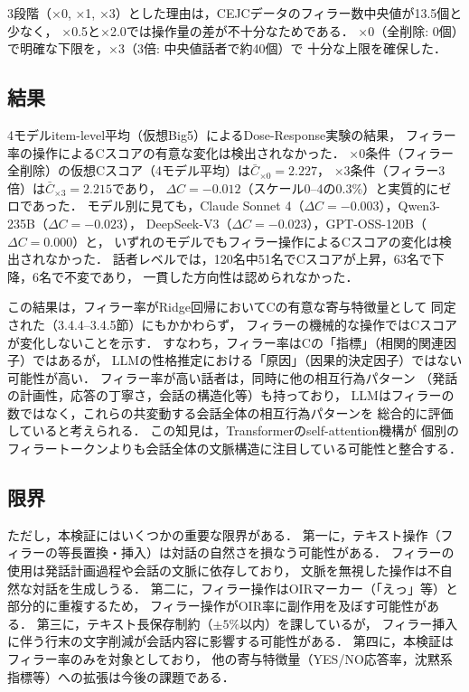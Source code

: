 \documentclass[dvipdfmx,11pt,a4paper]{bxjsarticle}
\renewcommand{\_}{\paperorigunderscore\allowbreak}%
\begin{document}
3段階（×0, ×1, ×3）とした理由は，CEJCデータのフィラー数中央値が13.5個と少なく，
×0.5と×2.0では操作量の差が不十分なためである．
×0（全削除: 0個）で明確な下限を，×3（3倍: 中央値話者で約40個）で
十分な上限を確保した．

\subsection{結果}

4モデルitem-level平均（仮想Big5）によるDose-Response実験の結果，
フィラー率の操作によるCスコアの有意な変化は検出されなかった．
×0条件（フィラー全削除）の仮想Cスコア（4モデル平均）は$\bar{C}_{{\times 0}} = 2.227$，
×3条件（フィラー3倍）は$\bar{C}_{{\times 3}} = 2.215$であり，
$\Delta C = -0.012$（スケール0--4の0.3\%）と実質的にゼロであった．
モデル別に見ても，Claude Sonnet 4（$\Delta C = -0.003$），Qwen3-235B（$\Delta C = -0.023$），
DeepSeek-V3（$\Delta C = -0.023$），GPT-OSS-120B（$\Delta C = 0.000$）と，
いずれのモデルでもフィラー操作によるCスコアの変化は検出されなかった．
話者レベルでは，120名中51名でCスコアが上昇，63名で下降，6名で不変であり，
一貫した方向性は認められなかった．

この結果は，フィラー率がRidge回帰においてCの有意な寄与特徴量として
同定された（3.4.4--3.4.5節）にもかかわらず，
フィラーの機械的な操作ではCスコアが変化しないことを示す．
すなわち，フィラー率はCの「指標」（相関的関連因子）ではあるが，
LLMの性格推定における「原因」（因果的決定因子）ではない可能性が高い．
フィラー率が高い話者は，同時に他の相互行為パターン
（発話の計画性，応答の丁寧さ，会話の構造化等）も持っており，
LLMはフィラーの数ではなく，これらの共変動する会話全体の相互行為パターンを
総合的に評価していると考えられる．
この知見は，Transformerのself-attention機構が
個別のフィラートークンよりも会話全体の文脈構造に注目している可能性と整合する．

\subsection{限界}
ただし，本検証にはいくつかの重要な限界がある．
第一に，テキスト操作（フィラーの等長置換・挿入）は対話の自然さを損なう可能性がある．
フィラーの使用は発話計画過程や会話の文脈に依存しており\cite{clark1996,watanabe2003}，
文脈を無視した操作は不自然な対話を生成しうる．
第二に，フィラー操作はOIRマーカー（「えっ」等）と部分的に重複するため，
フィラー操作がOIR率に副作用を及ぼす可能性がある．
第三に，テキスト長保存制約（$\pm 5\%$以内）を課しているが，
フィラー挿入に伴う行末の文字削減が会話内容に影響する可能性がある．
第四に，本検証はフィラー率のみを対象としており，
他の寄与特徴量（YES/NO応答率，沈黙系指標等）への拡張は今後の課題である．
\end{document}
